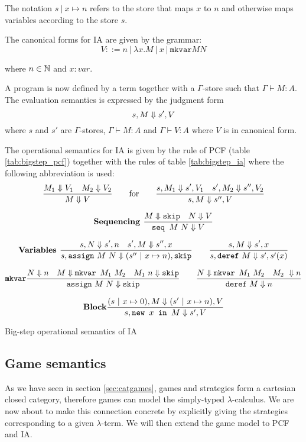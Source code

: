 The notation $s\ |\ x \mapsto n$ refers to the store that maps $x$ to $n$
and otherwise maps variables according to the store $s$.


The canonical forms for IA are given by the grammar:
$$ V ::= n\ |\ \lambda x. M\ |\ x\ |\  \texttt{mkvar} M N$$

where $n \in \mathbb{N}$ and $x:var$.


A program is now defined by a term together with a $\Gamma$-store such that $\Gamma \vdash M : A$.
The evaluation semantics is expressed by the judgment form
$$s,M \Downarrow s', V$$
where $s$ and $s'$ are $\Gamma$-stores,
$\Gamma \vdash M : A$ and $\Gamma \vdash V : A$ where $V$ is in canonical form.

The operational semantics for IA is given by the rule of PCF (table \ref{tab:bigstep_pcf})
together with the rules of table \ref{tab:bigstep_ia} where the following abbreviation is used:
$$ \frac{\displaystyle M_1 \Downarrow V_1 \quad M_2 \Downarrow V_2}{M \Downarrow V} \qquad \mbox{for} \qquad
  \frac{\displaystyle s,M_1 \Downarrow s',V_1 \quad s', M_2 \Downarrow s'',V_2 }{s,M \Downarrow s'',V}
$$


\begin{table}[htbp]
$$\mbox{\textbf{Sequencing }}
    \frac{\displaystyle M \Downarrow \texttt{skip} \quad N \Downarrow V}{\texttt{seq } M\ N \Downarrow V}
$$

$$\mbox{\textbf{Variables }}
    \frac{\displaystyle s,N \Downarrow s',n \quad s',M \Downarrow s'',x}{s, \texttt{assign}\ M\ N \Downarrow (s''\ |\ x \mapsto n),\texttt{skip}}
\qquad
    \frac{\displaystyle s,M \Downarrow s',x }{s, \texttt{deref}\ M \Downarrow s',s'(x)}$$

$$\mbox{\texttt{\textbf{mkvar}}}
    \frac{\displaystyle N \Downarrow n \quad M \Downarrow \texttt{mkvar } M_1\ M_2 \quad M_1\ n \Downarrow \texttt{skip}}{\texttt{assign}\ M\ N \Downarrow \texttt{skip}}
\qquad
    \frac{\displaystyle N \Downarrow \texttt{mkvar } M_1\ M_2 \quad M_2\ \Downarrow n}{\texttt{deref}\ M \Downarrow n}
$$

$$\mbox{\textbf{Block}}
    \frac{\displaystyle (s\ |\ x \mapsto 0),M \Downarrow (s'\ |\ x \mapsto n),V }{s, \texttt{new } x \texttt{ in } M \Downarrow s',V}
$$

\label{tab:bigstep_ia}
\caption{Big-step operational semantics of IA}
\end{table}

\subsection{Game semantics}

As we have seen in section \ref{sec:catgames}, games and strategies
form a cartesian closed category, therefore games can model the simply-typed $\lambda$-calculus.
We are now about to make this connection concrete by explicitly giving the strategies corresponding
to a given $\lambda$-term. We will then extend the game model to PCF and IA.

